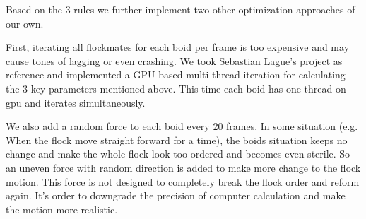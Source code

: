Based on the 3 rules we further implement two other optimization approaches of our own. 

First, iterating all flockmates for each boid per frame is too expensive and may cause tones of lagging or even crashing. We took Sebastian Lague’s project as reference and implemented a GPU based multi-thread iteration for calculating the 3 key parameters mentioned above. This time each boid has one thread on gpu and iterates simultaneously. 

We also add a random force to each boid every 20 frames. In some situation (e.g. When the flock move straight forward for a time), the boids situation keeps no change and make the whole flock look too ordered and becomes even sterile. So an uneven force with random direction is added to make more change to the flock motion. This force is not designed to completely break the flock order and reform again. It’s order to downgrade the precision of computer calculation and make the motion more realistic.